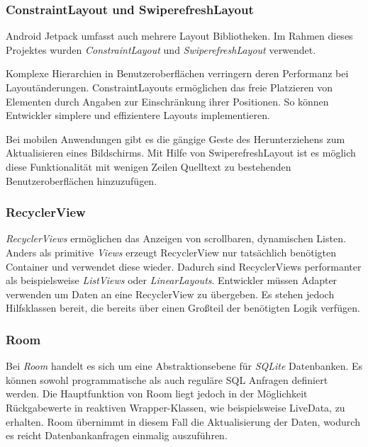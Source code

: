 \documentclass[a4paper, 11pt]{article}
\begin{document}
\subsubsection{ConstraintLayout und SwiperefreshLayout}
\label{subsubsec:app:jetpack:layouts}
Android Jetpack umfasst auch mehrere Layout Bibliotheken.
Im Rahmen dieses Projektes wurden \textit{ConstraintLayout} und \textit{SwiperefreshLayout} verwendet.

Komplexe Hierarchien in Benutzeroberflächen verringern deren Performanz bei Layoutänderungen.
ConstraintLayouts ermöglichen das freie Platzieren von Elementen durch Angaben zur Einschränkung ihrer Positionen.
So können Entwickler simplere und effizientere Layouts implementieren.

Bei mobilen Anwendungen gibt es die gängige Geste des Herunterziehens zum Aktualisieren eines Bildschirms.
Mit Hilfe von SwiperefreshLayout ist es möglich diese Funktionalität mit wenigen Zeilen Quelltext zu bestehenden Benutzeroberflächen hinzuzufügen.

\subsubsection{RecyclerView}
\label{subsubsec:app:jetpack:recyclerview}
\textit{RecyclerViews} ermöglichen das Anzeigen von scrollbaren, dynamischen Listen.
Anders als primitive \textit{Views} erzeugt RecyclerView nur tatsächlich benötigten Container und verwendet diese wieder.
Dadurch sind RecyclerViews performanter als beispielsweise \textit{ListViews} oder \textit{LinearLayouts}.
Entwickler müssen Adapter verwenden um Daten an eine RecyclerView zu übergeben.
Es stehen jedoch Hilfsklassen bereit, die bereits über einen Großteil der benötigten Logik verfügen.

\subsubsection{Room}
\label{subsubsec:app:jetpack:room}
Bei \textit{Room} handelt es sich um eine Abstraktionsebene für \textit{SQLite} Datenbanken.
Es können sowohl programmatische als auch reguläre SQL Anfragen definiert werden.
Die Hauptfunktion von Room liegt jedoch in der Möglichkeit Rückgabewerte in reaktiven Wrapper-Klassen, wie beispielsweise LiveData, zu erhalten.
Room übernimmt in diesem Fall die Aktualisierung der Daten, wodurch es reicht Datenbankanfragen einmalig auszuführen.
\end{document}
